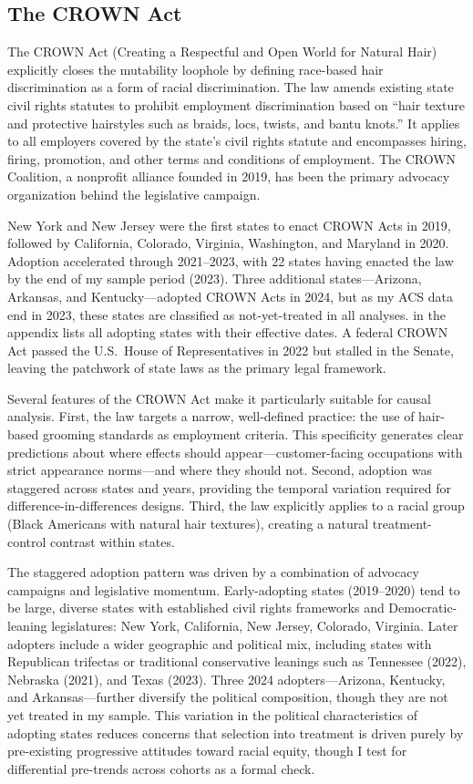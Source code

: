 \documentclass[12pt]{article}
\begin{document}
\subsection{The CROWN Act}

The CROWN Act (Creating a Respectful and Open World for Natural Hair) explicitly closes the mutability loophole by defining race-based hair discrimination as a form of racial discrimination. The law amends existing state civil rights statutes to prohibit employment discrimination based on ``hair texture and protective hairstyles such as braids, locs, twists, and bantu knots.'' It applies to all employers covered by the state's civil rights statute and encompasses hiring, firing, promotion, and other terms and conditions of employment. The CROWN Coalition, a nonprofit alliance founded in 2019, has been the primary advocacy organization behind the legislative campaign.

New York and New Jersey were the first states to enact CROWN Acts in 2019, followed by California, Colorado, Virginia, Washington, and Maryland in 2020. Adoption accelerated through 2021--2023, with 22 states having enacted the law by the end of my sample period (2023). Three additional states---Arizona, Arkansas, and Kentucky---adopted CROWN Acts in 2024, but as my ACS data end in 2023, these states are classified as not-yet-treated in all analyses.  in the appendix lists all adopting states with their effective dates. A federal CROWN Act passed the U.S.\ House of Representatives in 2022 but stalled in the Senate, leaving the patchwork of state laws as the primary legal framework.

Several features of the CROWN Act make it particularly suitable for causal analysis. First, the law targets a narrow, well-defined practice: the use of hair-based grooming standards as employment criteria. This specificity generates clear predictions about where effects should appear---customer-facing occupations with strict appearance norms---and where they should not. Second, adoption was staggered across states and years, providing the temporal variation required for difference-in-differences designs. Third, the law explicitly applies to a racial group (Black Americans with natural hair textures), creating a natural treatment-control contrast within states.

The staggered adoption pattern was driven by a combination of advocacy campaigns and legislative momentum. Early-adopting states (2019--2020) tend to be large, diverse states with established civil rights frameworks and Democratic-leaning legislatures: New York, California, New Jersey, Colorado, Virginia. Later adopters include a wider geographic and political mix, including states with Republican trifectas or traditional conservative leanings such as Tennessee (2022), Nebraska (2021), and Texas (2023). Three 2024 adopters---Arizona, Kentucky, and Arkansas---further diversify the political composition, though they are not yet treated in my sample. This variation in the political characteristics of adopting states reduces concerns that selection into treatment is driven purely by pre-existing progressive attitudes toward racial equity, though I test for differential pre-trends across cohorts as a formal check.
\end{document}
